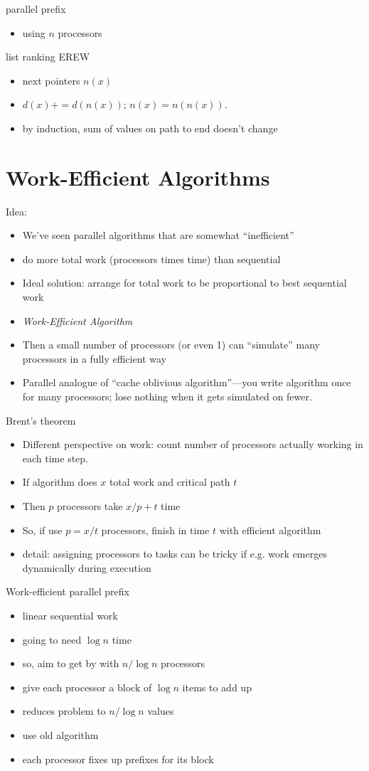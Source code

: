 \documentclass[12pt]{article}
\begin{document}
parallel prefix
\begin{itemize}
\item using $n$ processors
\end{itemize}

list ranking EREW
\begin{itemize}
\item next pointers $n(x)$
\item $d(x)+=d(n(x))$; $n(x)=n(n(x))$.
\item by induction, sum of values on path to end doesn't change
\end{itemize}

\section{Work-Efficient Algorithms}

Idea: 
\begin{itemize}
\item We've seen parallel algorithms that are somewhat ``inefficient''
\item do more total work  (processors times time) than sequential
\item Ideal solution: arrange for total work to be
  proportional to best sequential work
\item \emph{Work-Efficient Algorithm}
\item Then a small number of  processors (or even 1) can ``simulate''
  many processors in a fully efficient way
\item Parallel analogue of ``cache oblivious algorithm''---you write
  algorithm once for many processors; lose nothing when it gets
  simulated on fewer.
\end{itemize}


Brent's theorem
\begin{itemize}
\item Different perspective on work: count number of processors actually
working in each time step.
\item If algorithm does $x$ total work and critical path $t$
\item Then $p$ processors take $x/p+t$ time
\item So, if use $p=x/t$ processors, finish in time $t$ with efficient
  algorithm
\item detail: assigning processors to tasks can be tricky if e.g. work
  emerges dynamically during execution
\end{itemize}

Work-efficient parallel prefix
\begin{itemize}
\item linear sequential work
\item going to need $\log n$ time
\item so, aim to get by with $n/\log n$ processors
\item give each processor a block of $\log n$ items to add up
\item reduces problem to $n/\log n$ values
\item use old algorithm
\item each processor fixes up prefixes for its block
\end{itemize}
\end{document}
